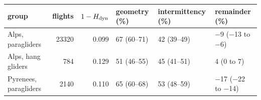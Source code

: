 \begin{tabular}{lrrlll}
\toprule
group & flights & $1-H_{\mathrm{dyn}}$ & geometry (\%) & intermittency (\%) & remainder (\%) \\
\midrule
Alps, paragliders & 23320 & 0.099 & 67 (60--71) & 42 (39--49) & $-$9 ($-$13 to $-$6) \\
Alps, hang gliders & 784 & 0.129 & 51 (46--55) & 45 (41--51) & 4 (0 to 7) \\
Pyrenees, paragliders & 2140 & 0.110 & 65 (60--68) & 53 (48--59) & $-$17 ($-$22 to $-$14) \\
\bottomrule
\end{tabular}
